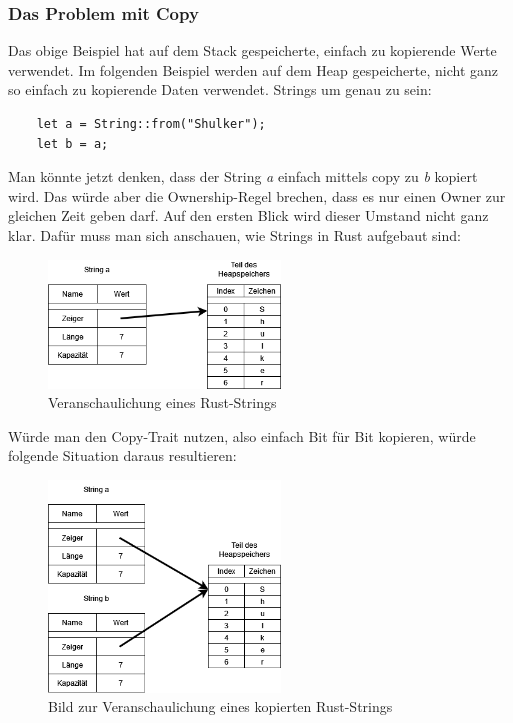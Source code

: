 \subsubsection{Das Problem mit Copy}
Das obige Beispiel hat auf dem Stack gespeicherte, einfach zu kopierende Werte verwendet. Im folgenden Beispiel werden auf dem Heap gespeicherte,
nicht ganz so einfach zu kopierende Daten verwendet. Strings um genau zu sein:
\begin{lstlisting}
    let a = String::from("Shulker");
    let b = a;
\end{lstlisting}
Man könnte jetzt denken, dass der String \textit{a} einfach mittels copy zu \textit{b} kopiert wird. Das würde aber die Ownership-Regel brechen, dass
es nur einen Owner zur gleichen Zeit geben darf. Auf den ersten Blick wird dieser Umstand nicht ganz klar. Dafür muss man sich anschauen, wie Strings
in Rust aufgebaut sind:
\begin{figure}[H]
    \begin{center}
        \includegraphics[width=0.55\textwidth]{images/rust/string_repr.png}
        \caption{Veranschaulichung eines Rust-Strings}
    \end{center}
\end{figure}
Würde man den Copy-Trait nutzen, also einfach Bit für Bit kopieren, würde folgende Situation daraus resultieren:
\begin{figure}[H]
    \begin{center}
        \includegraphics[width=0.55\textwidth]{images/rust/string_copy_repr.png}
        \caption{Bild zur Veranschaulichung eines kopierten Rust-Strings}
    \end{center}
\end{figure}
